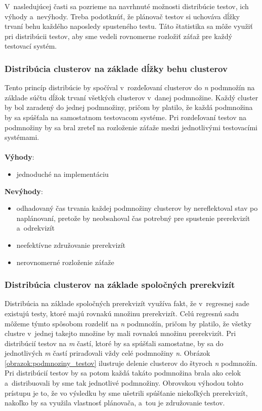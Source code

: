 V~nasledujúcej časti sa pozrieme na navrhnuté možnosti distribúcie 
testov, ich výhody a~nevýhody. Treba podotknúť, že plánovač testov si 
uchováva dĺžky trvaní behu každého naposledy spusteného testu.
Táto štatistika sa môže využiť pri distribúcii testov, aby sme vedeli 
rovnomerne rozložiť záťaž pre každý testovací systém.

\subsubsection*{Distribúcia clusterov na základe dĺžky behu clusterov}
Tento princíp distribúcie by spočíval v~rozdeľovaní clusterov do \textit{n} 
podmnožín na základe súčtu dĺžok trvaní všetkých clusterov v~danej podmnožine. 
Každý cluster by bol zaradený do jednej podmnožiny, pričom by platilo,
že každá podmnožina by sa spúšťala na samostatnom testovacom systéme. 
Pri rozdeľovaní testov na podmnožiny by sa bral zreteľ na rozloženie 
záťaže medzi jednotlivými testovacími systémami.
\\
\\
\noindent \textbf{Výhody}:
\begin{itemize}
\item jednoduché na implementáciu
\end{itemize} 

\noindent \textbf{Nevýhody}:
\begin{itemize}
\item odhadovaný čas trvania každej podmnožiny clusterov by nereflektoval stav 
po naplánovaní, pretože by neobsahoval čas potrebný pre spustenie 
prerekvizít a~odrekvizít
\item neefektívne združovanie prerekvizít
\item nerovnomerné rozloženie záťaže
\end{itemize}

\subsubsection*{Distribúcia clusterov na základe spoločných prerekvizít}
Distribúcia na základe spoločných prerekvizít využíva fakt, že 
v~regresnej sade existujú testy, ktoré majú rovnakú množinu prerekvizít.
Celú regresnú sadu môžeme týmto spôsobom rozdeliť na \emph{n} podmnožín, 
pričom by platilo, že všetky clustre v~jednej takejto množine by mali
rovnakú množinu prerekvizít. Pri distribúcií testov na \emph{m} častí, 
ktoré by sa spúšťali samostatne, by sa do jednotlivých \emph{m} častí
priraďovali vždy celé podmnožiny \emph{n}. 
Obrázok \ref{obrazok:podmnoziny_testov} ilustruje delenie clusterov do 
štyroch \emph{n} podmnožín. Pri distribúcií testov by sa potom každá 
takáto podmnožina brala ako celok a~distribuovali by sme tak 
jednotlivé podmnožiny.
Obrovskou výhodou tohto prístupu je to, že vo výsledku by sme ušetrili 
spúšťanie niekoľkých prerekvizít, nakoľko by sa využila vlastnosť 
plánovača, a~tou je združovanie testov. 

